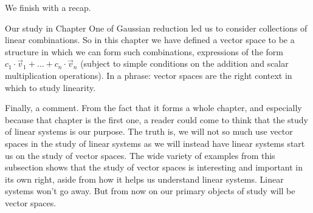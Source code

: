 We finish with a recap.

Our study in Chapter One of Gaussian reduction
led us to consider collections of linear combinations.
So in this chapter we have defined a vector space to be a 
structure in which we can form such combinations,
expressions of the form \( c_1\cdot\vec{v}_1+\dots+c_n\cdot\vec{v}_n \)
(subject to simple conditions on the addition and scalar
multiplication operations).
In a phrase: vector spaces are
the right context in which to study linearity.

Finally, a comment.
From the fact that it forms a whole chapter, and especially because that 
chapter is the first one, a reader could come to think that the study of linear
systems is our purpose.
The truth is, we will not so much use vector spaces in
the study  of linear systems as we will instead have linear systems 
start us on the study of vector spaces.
The wide variety of examples from this subsection shows that the study of
vector spaces is interesting and important in its own right, aside from
how it helps us understand linear systems.
Linear systems won't go away.
But from now on our primary objects of study will be vector spaces.

